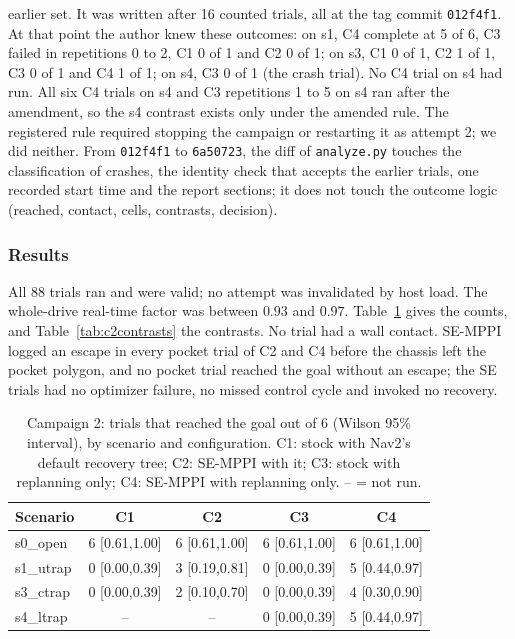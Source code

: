 \documentclass[journal]{IEEEtran}
\begin{document}
\begin{enumerate}
  earlier set. It was written after 16 counted trials, all at the tag commit
  \texttt{012f4f1}. At that point the author knew these outcomes: on s1, C4 complete at 5 of 6,
  C3 failed in repetitions 0 to 2, C1 0 of 1 and C2 0 of 1; on s3, C1 0 of 1, C2 1 of 1, C3 0 of
  1 and C4 1 of 1; on s4, C3 0 of 1 (the crash trial). No C4 trial on s4 had run. All six C4
  trials on s4 and C3 repetitions 1 to 5 on s4 ran after the amendment, so the s4 contrast
  exists only under the amended rule. The registered rule required stopping the campaign or
  restarting it as attempt 2; we did neither. From \texttt{012f4f1} to \texttt{6a50723}, the diff of
  \texttt{analyze.py} touches the classification of crashes, the identity check that accepts
  the earlier trials, one recorded start time and the report sections; it does not touch the
  outcome logic (reached, contact, cells, contrasts, decision).
\end{enumerate}

\subsubsection{Results}
\label{sec:c2results}

All 88 trials ran and were valid; no attempt was invalidated by host load. The whole-drive real-time factor was between
$0.93$ and $0.97$. Table~\ref{tab:c2cells} gives the counts, and Table~\ref{tab:c2contrasts}
the contrasts. No trial had a wall contact. SE-MPPI logged an escape in every pocket trial of C2 and C4 before the
chassis left the pocket polygon, and no pocket trial reached the goal without an escape; the SE trials
had no optimizer failure, no missed control cycle and invoked no recovery.

\begin{table}[t]
\centering
\caption{Campaign 2: trials that reached the goal out of 6 (Wilson 95\% interval), by scenario
and configuration. C1: stock with Nav2's default recovery tree; C2: SE-MPPI with it; C3: stock
with replanning only; C4: SE-MPPI with replanning only. -- = not run.}
\label{tab:c2cells}
\footnotesize
\setlength{\tabcolsep}{3pt}
\begin{tabular}{lcccc}
\toprule
Scenario & C1 & C2 & C3 & C4 \\
\midrule
s0\_open   & 6 [0.61,1.00] & 6 [0.61,1.00] & 6 [0.61,1.00] & 6 [0.61,1.00] \\
s1\_utrap  & 0 [0.00,0.39] & 3 [0.19,0.81] & 0 [0.00,0.39] & 5 [0.44,0.97] \\
s3\_ctrap  & 0 [0.00,0.39] & 2 [0.10,0.70] & 0 [0.00,0.39] & 4 [0.30,0.90] \\
s4\_ltrap  & -- & -- & 0 [0.00,0.39] & 5 [0.44,0.97] \\
\bottomrule
\end{tabular}
\end{table}
\end{document}
